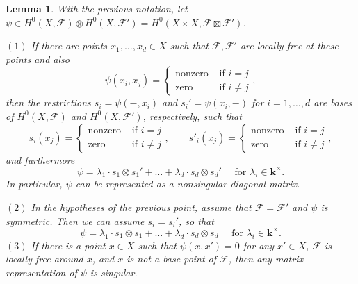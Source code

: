 \documentclass[12pt]{amsart}
\newcounter{thmcounter}
\numberwithin{equation}{section}
\numberwithin{thmcounter}{section}
\newtheorem{lemma}[thmcounter]{Lemma}
\theoremstyle{definition}
\theoremstyle{claim}
\newcommand{\kk}{\mathbf{k}}
\newcommand{\sF}{\mathscr{F}}
\begin{document}
\begin{lemma}\label{lem:easymadecomplicated}
	With the previous notation, let  $\psi \in H^0(X,\sF)\otimes H^0(X,\sF') = H^0(X\times X,\mathscr{F}\boxtimes \mathscr{F}')$.
    \medskip

    \noindent
	$(1)$ If there are points $x_1,\dots,x_d\in X$ such that $\sF,\sF'$ are locally free at these points and also
		\[
		\psi(x_i,x_j) = \begin{cases} \text{nonzero} &\text{ if } i= j \\ \text{zero} &\text{ if } i\ne j  \end{cases},
		\]
		then the restrictions $s_i = \psi(-,x_i)$ and $s_i'=\psi(x_i,-)$ for $i=1,\dots,d$ are bases of $H^0(X,\sF)$ and  $H^0(X,\sF')$, respectively, such that
		\[
		s_i(x_j) = \begin{cases} \text{nonzero} &\text{ if } i= j \\ \text{zero} &\text{ if } i\ne j  \end{cases}, \qquad
		s'_i(x_j) = \begin{cases} \text{nonzero} &\text{ if } i= j \\ \text{zero} &\text{ if } i\ne j  \end{cases},
		\]
		and furthermore
		\[ \psi = \lambda_1\cdot s_1\otimes s_1' + \dots + \lambda_d \cdot s_d\otimes s_d' \quad \text{ for } \lambda_i\in \kk^{\times}. \]
		In particular,
		$\psi$ can be represented as a nonsingular diagonal matrix.
		\medskip

		\noindent
		$(2)$ In the hypotheses of the previous point, assume that $\mathscr{F} = \mathscr{F}'$ and $\psi$ is symmetric.  Then we can assume $s_i = s_i'$, so that
		\[ \psi = \lambda_1\cdot s_1\otimes s_1 + \dots + \lambda_d \cdot s_d\otimes s_d \quad \text{ for } \lambda_i\in \kk^{\times}. \]
		\noindent
		$(3)$ If there is a point $x\in X$ such that $\psi(x,x')=0$ for any $x'\in X$, $\sF$ is locally free around $x$, and $x$ is not a base point of $\mathscr{F}$, then any matrix representation of $\psi$ is singular.
\end{lemma}
\end{document}
